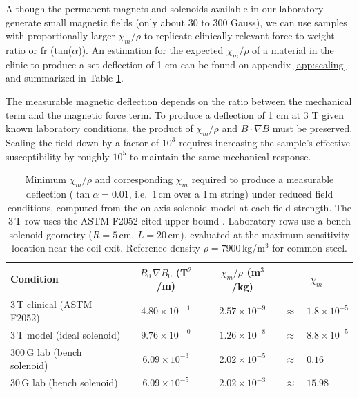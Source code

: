 Although the permanent magnets and solenoids available in our laboratory generate small magnetic fields (only about 30 to 300 Gauss), we can use samples with proportionally larger $\chi_m/\rho$ to replicate clinically relevant force-to-weight ratio or \gls{fr} (tan($\alpha$)). An estimation for the expected $\chi_m/\rho$ of a material in the clinic to produce a set deflection of 1 cm can be found on appendix \ref{app:scaling} and summarized in Table \ref{tab:chi_scaling}.

The measurable magnetic deflection depends on the ratio between the mechanical term and the magnetic force term. To produce a deflection of 1 cm at 3 T given known laboratory conditions, the product of $\chi_m/\rho$ and $B\cdot\nabla B$ must be preserved. Scaling the field down by a factor of $10^{3}$ requires increasing the sample’s effective susceptibility by roughly $10^{5}$ to maintain the same mechanical response.

\begin{table}[hbt!]
	\centering
	\caption[Representative susceptibility scaling for laboratory fields.]{%
		Minimum $\chi_m/\rho$ and corresponding $\chi_m$ required to produce
		a measurable deflection ($\tan\alpha = 0.01$, i.e.\ 1\,cm over a 1\,m
		string) under reduced field conditions, computed from the on-axis
		solenoid model at each field strength. The 3\,T row uses the ASTM
		F2052 cited upper bound \cite{astmF2052}. Laboratory rows use a
		bench solenoid geometry ($R=5$\,cm, $L=20$\,cm), evaluated at the
		maximum-sensitivity location near the coil exit.
		Reference density $\rho = 7900$\,kg/m$^3$ for common steel.}
	\label{tab:chi_scaling}
	\begin{tabular}{|l|c|c|cl|}
		\hline
		Condition & $B_0\,\nabla B_0$ (T$^2$/m) & $\chi_m/\rho$ (m$^3$/kg) & \multicolumn{2}{c|}{$\chi_m$} \\
		\hline
		3\,T clinical (ASTM F2052)  & $4.80\times10^{\phantom{-}1}$  & $2.57\times10^{-9}$ & $\approx$ & $ 1.8\times10^{-5}$ \\
		3\,T model (ideal solenoid) & $9.76\times10^{\phantom{-}0}$ & $1.26\times10^{-8}$ & $\approx$ & $ 8.8\times10^{-5} $ \\
		300\,G lab (bench solenoid) & $6.09\times10^{-3}$ & $2.02\times10^{-5}$ & $\approx$ & $ 0.16 $ \\
		30\,G lab (bench solenoid)  & $6.09\times10^{-5}$ & $2.02\times10^{-3}$ & $\approx$ & $ 15.98$  \\
		\hline
	\end{tabular}
\end{table}

